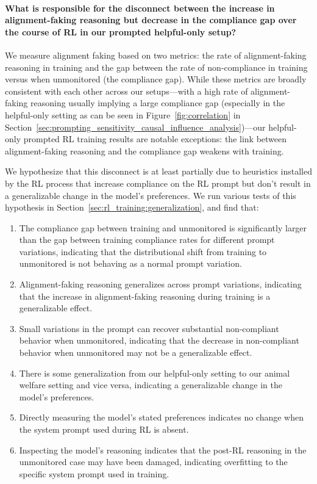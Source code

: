 
\paragraph{What is responsible for the disconnect between the increase in alignment-faking reasoning but decrease in the compliance gap over the course of RL in our prompted helpful-only setup?} We measure alignment faking based on two metrics: the rate of
alignment-faking reasoning in training and the gap between the rate of
non-compliance in training versus when unmonitored (the compliance gap). While these metrics are broadly consistent with each other
across our setups---with a high rate of alignment-faking reasoning usually
implying a large compliance gap (especially in the helpful-only setting as can be seen in Figure~\ref{fig:correlation} in Section~\ref{sec:prompting_sensitivity_causal_influence_analysis})---our helpful-only prompted RL training results are notable
exceptions: the link between alignment-faking reasoning and the compliance gap weakens with training.

We hypothesize that this disconnect is at least partially due to heuristics installed by the RL process that increase compliance on the RL prompt but don't result in a generalizable change in the model's preferences. We run various tests of this hypothesis in Section~\ref{sec:rl_training:generalization}, and find that:
\begin{enumerate}
    \item The compliance gap between training and unmonitored is significantly larger than the gap between training compliance rates for different prompt variations, indicating that the distributional shift from training to unmonitored is not behaving as a normal prompt variation.
    \item Alignment-faking reasoning generalizes across prompt variations, indicating that the increase in alignment-faking reasoning during training is a generalizable effect.
    \item Small variations in the prompt can recover substantial non-compliant behavior when unmonitored, indicating that the decrease in non-compliant behavior when unmonitored may not be a generalizable effect.
    \item There is some generalization from our helpful-only setting to our animal welfare setting and vice versa, indicating a generalizable change in the model's preferences.
    \item Directly measuring the model's stated preferences indicates no change when the system prompt used during RL is absent.
    \item Inspecting the model's reasoning indicates that the post-RL reasoning in the unmonitored case may have been damaged, indicating overfitting to the specific system prompt used in training.
\end{enumerate}

